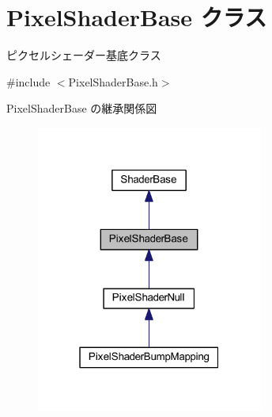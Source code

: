 \hypertarget{class_pixel_shader_base}{}\section{Pixel\+Shader\+Base クラス}
\label{class_pixel_shader_base}


ピクセルシェーダー基底クラス  




{\ttfamily \#include $<$Pixel\+Shader\+Base.\+h$>$}



Pixel\+Shader\+Base の継承関係図\nopagebreak
\begin{figure}[H]
\begin{center}
\leavevmode
\includegraphics[width=211pt]{class_pixel_shader_base__inherit__graph}
\end{center}
\end{figure}
